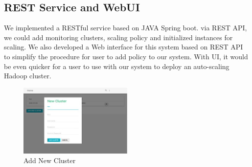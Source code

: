 \documentclass{article}
\begin{document}
\subsection{REST Service and WebUI}
We implemented a RESTful service based on JAVA Spring boot. via REST API, we could add monitoring clusters, scaling policy and initialized instances for scaling. We also developed a Web interface for this system based on REST API to simplify the procedure for user to add policy to our system. With UI, it would be even quicker for a user to use with our system to deploy an auto-scaling Hadoop cluster. 
\begin{figure}[ht!]
\centering
\includegraphics[width=0.5\textwidth,natwidth=1000,natheight=800]{addNewCluster.png}
\caption{Add New Cluster}
\label{fig:addNewCluster}
\end{figure}
\end{document}
